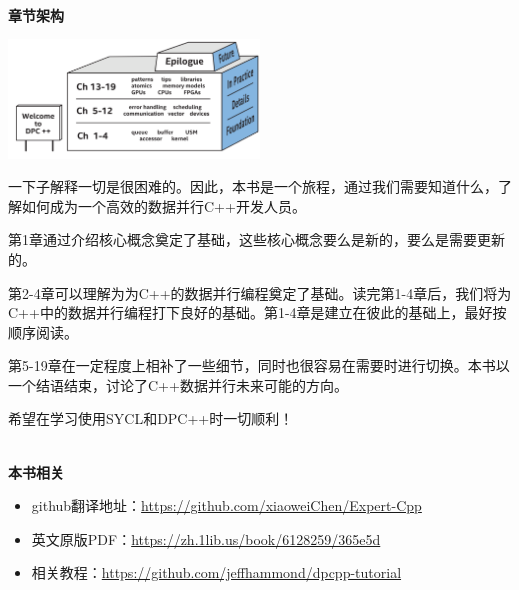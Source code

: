 \documentclass[11pt,a4paper,UTF8]{ctexart}
\begin{document}
	\hspace*{\fill} \\ %
	\noindent\textbf{章节架构}\ \par
	\begin{center}
		\includegraphics[width=0.5\textwidth]{images/struct-introduce}
	\end{center} \par
	一下子解释一切是很困难的。因此，本书是一个旅程，通过我们需要知道什么，了解如何成为一个高效的数据并行C++开发人员。\par
	
	第1章通过介绍核心概念奠定了基础，这些核心概念要么是新的，要么是需要更新的。\par
	
	第2-4章可以理解为为C++的数据并行编程奠定了基础。读完第1-4章后，我们将为C++中的数据并行编程打下良好的基础。第1-4章是建立在彼此的基础上，最好按顺序阅读。\par
	
	第5-19章在一定程度上相补了一些细节，同时也很容易在需要时进行切换。本书以一个结语结束，讨论了C++数据并行未来可能的方向。\par
	
	希望在学习使用SYCL和DPC++时一切顺利！\par
	
	\hspace*{\fill} \\ %
	\noindent\textbf{本书相关}\ \par
	\begin{itemize}
		\item github翻译地址：\href{https://github.com/xiaoweiChen/Expert-Cpp}{https://github.com/xiaoweiChen/Expert-Cpp}
		\item 英文原版PDF：\href{https://zh.1lib.us/book/6128259/365e5d}{https://zh.1lib.us/book/6128259/365e5d}
		\item 相关教程：\href{https://github.com/jeffhammond/dpcpp-tutorial}{https://github.com/jeffhammond/dpcpp-tutorial}
	\end{itemize}
	\newpage
	
	\tableofcontents
	\newpage
	
	\pagestyle{empty}
	
\end{document}
